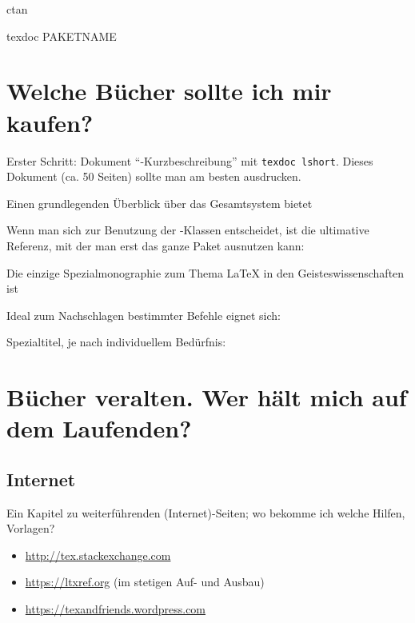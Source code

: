 
ctan


texdoc PAKETNAME


\section{Welche Bücher sollte ich mir kaufen?}

Erster Schritt: Dokument \enquote{\LaTeXe -Kurzbeschreibung} mit 
\lstinline/texdoc lshort/. Dieses Dokument (ca. 50 Seiten) sollte man am besten ausdrucken.

Einen grundlegenden Überblick über das Gesamtsystem bietet
\cite{voss:einfuehrung}

Wenn man sich zur Benutzung der \KOMAScript-Klassen entscheidet, ist die ultimative Referenz,
mit der man erst das ganze Paket ausnutzen kann:
\cite{kohm:2014}

Die einzige Spezialmonographie zum Thema \LaTeX{} in den Geisteswissenschaften ist
\cite{rouquette:2012}

Ideal zum Nachschlagen bestimmter Befehle eignet sich:
\cite{voss:referenz}

Spezialtitel, je nach individuellem Bedürfnis:

\cite{voss:praesentationen}

\cite{voss:bibliografien}

\cite{voss:pstricks}


\section{Bücher veralten. Wer hält mich auf dem Laufenden?}

\subsection{Internet}
Ein Kapitel zu weiterführenden (Internet)-Seiten; wo bekomme ich welche Hilfen, Vorlagen?

\begin{itemize}
    \item \url{http://tex.stackexchange.com}
    \item \url{https://ltxref.org} (im stetigen Auf- und Ausbau)
\end{itemize}


\begin{itemize}
    \item \url{https://texandfriends.wordpress.com}
\end{itemize}

